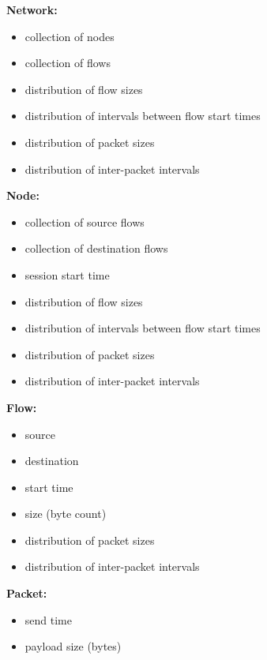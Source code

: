 \noindent
\textbf{Network:}
\begin{itemize}
  \item collection of nodes
  \item collection of flows
  \item distribution of flow sizes
  \item distribution of intervals between flow start times
  \item distribution of packet sizes
  \item distribution of inter-packet intervals
\end{itemize}
\noindent
\textbf{Node:}
\begin{itemize}
  \item collection of source flows
  \item collection of destination flows
  \item session start time
  \item distribution of flow sizes
  \item distribution of intervals between flow start times
  \item distribution of packet sizes
  \item distribution of inter-packet intervals
\end{itemize}
\noindent
\textbf{Flow:}
\begin{itemize}
  \item source
  \item destination
  \item start time
  \item size (byte count)
  \item distribution of packet sizes
  \item distribution of inter-packet intervals
\end{itemize}
\noindent
\textbf{Packet:}
\begin{itemize}
  \item send time
  \item payload size (bytes)
\end{itemize}
